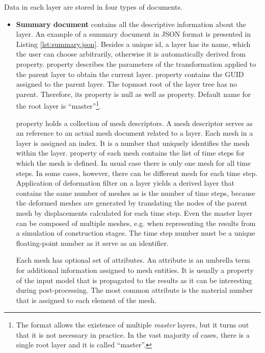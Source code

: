 Data in each layer are stored in four types of documents.
\begin{itemize}
    \item \textbf{Summary document} contains all the descriptive information about the layer. An example of a summary document in JSON format is presented in Listing \ref{lst:summary.json}. Besides a unique id, a layer has its name, which the user can choose arbitrarily, otherwise it is automatically derived from  property.  property describes the parameters of the transformation applied to the parent layer to obtain the current layer.  property contains the GUID assigned to the parent layer. The topmost root of the layer tree has no parent. Therefore, its  property is null as well as  property. Default name for the root layer is ``master''\footnote{The format allows the existence of multiple \textit{master} layers, but it turns out that it is not necessary in practice. In the vast majority of cases, there is a single root layer and it is called ``master''.}.

     property holds a collection of mesh descriptors. A mesh descriptor serves as an reference to an actual mesh document related to a layer. Each mesh in a layer is assigned an index. It is a number that uniquely identifies the mesh within the layer.  property of each mesh contains the list of time steps for which the mesh is defined. In usual case there is only one mesh for all time steps. In some cases, however, there can be different mesh for each time step. Application of deformation filter on a layer yields a derived layer that contains the same number of meshes as is the number of time steps, because the deformed meshes are generated by translating the nodes of the parent mesh by displacements calculated for each time step. Even the master layer can be composed of multiple meshes, e.g. when representing the results from a simulation of construction stages. The time step number must be a unique floating-point number as it serve as an identifier.
    
    Each mesh has optional set of attributes. An attribute is an umbrella term for additional information assigned to mesh entities. It is usually a property of the input model that is propagated to the results as it can be interesting during post-processing. The most common attribute is the material number that is assigned to each element of the mesh.


\end{itemize}
